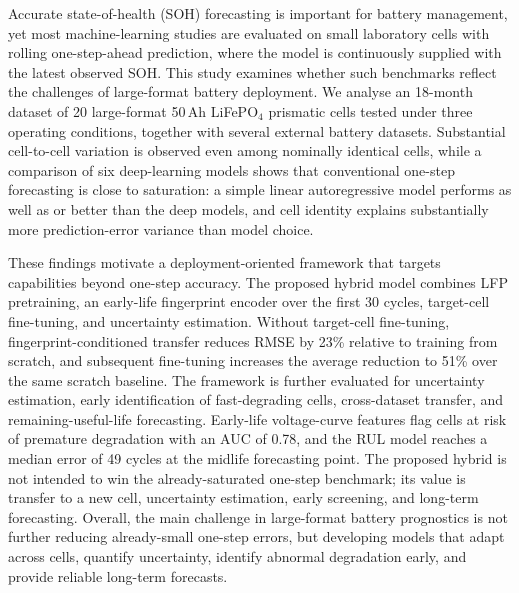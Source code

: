 Accurate state-of-health (SOH) forecasting is important for battery management, yet
most machine-learning studies are evaluated on small laboratory cells with rolling
one-step-ahead prediction, where the model is continuously supplied with the latest
observed SOH. This study examines whether such benchmarks reflect the challenges of
large-format battery deployment. We analyse an 18-month dataset of 20 large-format
50\,Ah LiFePO$_4$ prismatic cells tested under three operating conditions, together
with several external battery datasets. Substantial cell-to-cell variation is
observed even among nominally identical cells, while a comparison of six
deep-learning models shows that conventional one-step forecasting is close to
saturation: a simple linear autoregressive model performs as well as or better than
the deep models, and cell identity explains substantially more prediction-error
variance than model choice.

These findings motivate a deployment-oriented framework that targets capabilities
beyond one-step accuracy. The proposed hybrid model combines LFP pretraining, an
early-life fingerprint encoder over the first 30 cycles, target-cell fine-tuning, and
uncertainty estimation. Without target-cell fine-tuning, fingerprint-conditioned
transfer reduces RMSE by 23\% relative to training from scratch, and subsequent
fine-tuning increases the average reduction to 51\% over the same scratch baseline.
The framework is further evaluated for uncertainty estimation, early identification
of fast-degrading cells, cross-dataset transfer, and remaining-useful-life
forecasting. Early-life voltage-curve features flag cells at risk of premature
degradation with an AUC of 0.78, and the RUL model reaches a median error of 49
cycles at the midlife forecasting point. The proposed hybrid is not intended to win
the already-saturated one-step benchmark; its value is transfer to a new cell,
uncertainty estimation, early screening, and long-term forecasting. Overall, the main
challenge in large-format battery prognostics is not further reducing already-small
one-step errors, but developing models that adapt across cells, quantify uncertainty,
identify abnormal degradation early, and provide reliable long-term forecasts.
